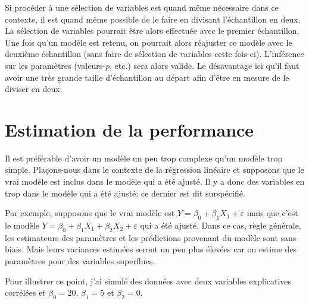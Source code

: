 \documentclass[
  11pt,
  letterpaper,
]{scrbook}
\theoremstyle{definition}
\theoremstyle{remark}
\begin{document}
Si procéder à une sélection de variables est quand même nécessaire dans
ce contexte, il est quand même possible de le faire en divisant
l'échantillon en deux. La sélection de variables pourrait être alors
effectuée avec le premier échantillon. Une fois qu'un modèle est retenu,
on pourrait alors réajuster ce modèle avec le deuxième échantillon (sans
faire de sélection de variables cette fois-ci). L'inférence sur les
paramètres (valeurs-\emph{p}, etc.) sera alors valide. Le désavantage
ici qu'il faut avoir une très grande taille d'échantillon au départ afin
d'être en mesure de le diviser en deux.

\hypertarget{estimation-de-la-performance}{%
\section{Estimation de la
performance}\label{estimation-de-la-performance}}

Il est préférable d'avoir un modèle un peu trop complexe qu'un modèle
trop simple. Plaçons-nous dans le contexte de la régression linéaire et
supposons que le vrai modèle est inclus dans le modèle qui a été ajusté.
Il y a donc des variables en trop dans le modèle qui a été ajusté: ce
dernier est dit surspécifié.

Par exemple, supposons que le vrai modèle est
\(Y=\beta_0+\beta_1X_1+\varepsilon\) mais que c'est le modèle
\(Y=\beta_0+\beta_1X_1+\beta_2X_2+\varepsilon\) qui a été ajusté. Dans
ce cas, règle générale, les estimateurs des paramètres et les
prédictions provenant du modèle sont sans biais. Mais leurs variances
estimées seront un peu plus élevées car on estime des paramètres pour
des variables superflues.

Pour illustrer ce point, j'ai simulé des données avec deux variables
explicatives corrélées et \(\beta_0 = 20\), \(\beta_1=5\) et
\(\beta_2 = 0\).
\end{document}
